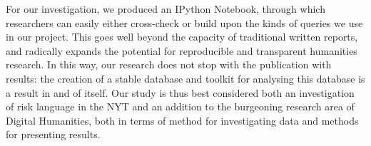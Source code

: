 For our investigation, we produced an IPython Notebook, through which researchers can easily either cross-check or build upon the kinds of queries we use in our project. This goes well beyond the capacity of traditional written reports, and radically expands the potential for reproducible and transparent humanities research. In this way, our research does not stop with the publication with results: the creation of a stable database and toolkit for analysing this database is a result in and of itself. Our study is thus best considered both an investigation of risk language in the NYT and an addition to the burgeoning research area of Digital Humanities, both in terms of method for investigating data and methods for presenting results.



